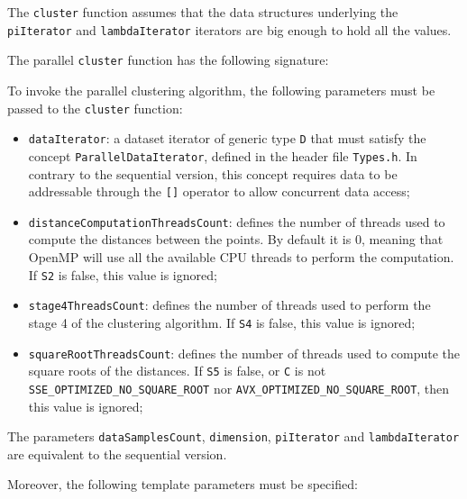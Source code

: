 \documentclass{article}
\begin{document}
The \texttt{cluster} function assumes that the data structures
underlying the \texttt{piIterator} and \texttt{lambdaIterator} iterators
are big enough to hold all the values.


The parallel \texttt{cluster} function has the following signature:

To invoke the parallel clustering algorithm, the following parameters
must be passed to the \texttt{cluster} function:

\begin{itemize}
    \item
    \texttt{dataIterator}: a dataset iterator of generic type \texttt{D}
    that must satisfy the concept \texttt{ParallelDataIterator}, defined
    in the header file \texttt{Types.h}. In contrary to the sequential
    version, this concept requires data to be addressable through the
    \texttt{{[}{]}} operator to allow concurrent data access;
    \item
    \texttt{distanceComputationThreadsCount}: defines the number of
    threads used to compute the distances between the points. By default
    it is \(0\), meaning that OpenMP will use all the available CPU
    threads to perform the computation. If \texttt{S2} is false, this
    value is ignored;
    \item
    \texttt{stage4ThreadsCount}: defines the number of threads used to
    perform the stage 4 of the clustering algorithm. If \texttt{S4} is
    false, this value is ignored;
    \item
    \texttt{squareRootThreadsCount}: defines the number of threads used to
    compute the square roots of the distances. If \texttt{S5} is false, or
    \texttt{C} is not \texttt{SSE\_OPTIMIZED\_NO\_SQUARE\_ROOT} nor
    \texttt{AVX\_OPTIMIZED\_NO\_SQUARE\_ROOT}, then this value is ignored;
\end{itemize}

The parameters \texttt{dataSamplesCount}, \texttt{dimension},
\texttt{piIterator} and \texttt{lambdaIterator} are equivalent to the
sequential version.

Moreover, the following template parameters must be specified:
\end{document}

